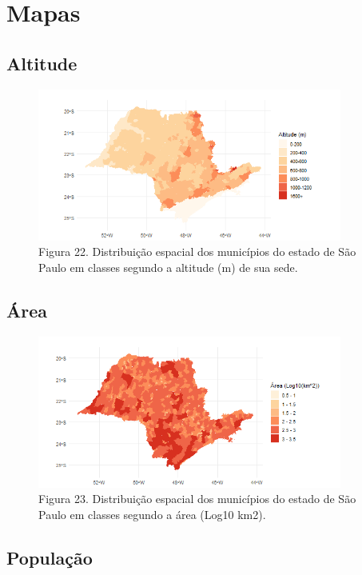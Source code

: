 \section{Mapas}

\texto

\subsection{Altitude}

\begin{figure}[h!]
\centering
\includegraphics[height = 5cm]{Imagens/511.png}
\\{\scriptsize Figura 22. Distribuição espacial dos municípios do estado de São Paulo em classes segundo a altitude (m) de sua sede.}
\end{figure}

\texto

\subsection {Área}

\begin{figure}[h!]
\centering
\includegraphics[height = 5cm]{Imagens/521.png}
\\{\scriptsize Figura 23. Distribuição espacial dos municípios do estado de São Paulo em classes segundo a área (Log10 km2).}
\end{figure}

\texto


\subsection {População}

